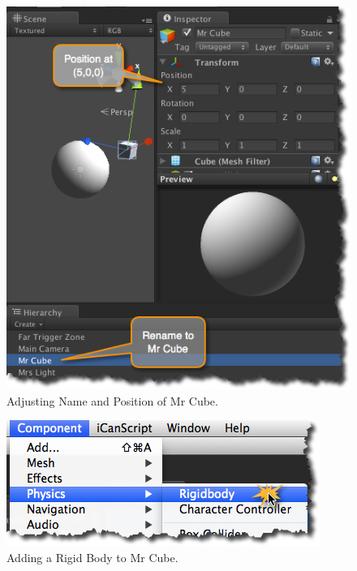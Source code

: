 \begin{figure}[htbp]
\centering
\includegraphics[keepaspectratio,width=\textwidth,height=0.75\textheight]{configure-mr-cube-name-and-position.png}
\caption{Adjusting Name and Position of Mr Cube.}
\label{configure-mr-cube-name-and-position.png}
\end{figure}

\begin{figure}[htbp]
\centering
\includegraphics[keepaspectratio,width=\textwidth,height=0.75\textheight]{adding-rigid-body.png}
\caption{Adding a Rigid Body to Mr Cube.}
\label{adding-rigid-body.png}
\end{figure}

